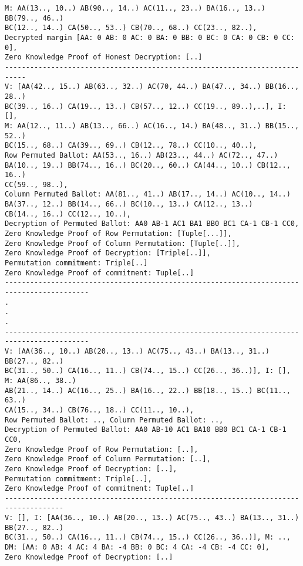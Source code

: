 \documentclass{llncs}
\begin{document}
\begin{verbatim}
M: AA(13.., 10..) AB(90.., 14..) AC(11.., 23..) BA(16.., 13..) BB(79.., 46..)
BC(12.., 14..) CA(50.., 53..) CB(70.., 68..) CC(23.., 82..), 
Decrypted margin [AA: 0 AB: 0 AC: 0 BA: 0 BB: 0 BC: 0 CA: 0 CB: 0 CC: 0], 
Zero Knowledge Proof of Honest Decryption: [..]
---------------------------------------------------------------------------
V: [AA(42.., 15..) AB(63.., 32..) AC(70, 44..) BA(47.., 34..) BB(16.., 28..)
BC(39.., 16..) CA(19.., 13..) CB(57.., 12..) CC(19.., 89..),..], I:  [], 
M: AA(12.., 11..) AB(13.., 66..) AC(16.., 14.) BA(48.., 31..) BB(15.., 52..)
BC(15.., 68..) CA(39.., 69..) CB(12.., 78..) CC(10.., 40..),
Row Permuted Ballot: AA(53.., 16..) AB(23.., 44..) AC(72.., 47..)
BA(10.., 19..) BB(74.., 16..) BC(20.., 60..) CA(44.., 10..) CB(12.., 16..)
CC(59.., 98..),
Column Permuted Ballot: AA(81.., 41..) AB(17.., 14..) AC(10.., 14..) 
BA(37.., 12..) BB(14.., 66..) BC(10.., 13..) CA(12.., 13..) 
CB(14.., 16..) CC(12.., 10..),
Decryption of Permuted Ballot: AA0 AB-1 AC1 BA1 BB0 BC1 CA-1 CB-1 CC0,
Zero Knowledge Proof of Row Permutation: [Tuple[...]], 
Zero Knowledge Proof of Column Permutation: [Tuple[..]], 
Zero Knowledge Proof of Decryption: [Triple[..]], 
Permutation commitment: Triple[..]
Zero Knowledge Proof of commitment: Tuple[..]
------------------------------------------------------------------------------------------
.
.
.
------------------------------------------------------------------------------------------
V: [AA(36.., 10..) AB(20.., 13..) AC(75.., 43..) BA(13.., 31..) BB(27.., 82..)
BC(31.., 50..) CA(16.., 11..) CB(74.., 15..) CC(26.., 36..)], I: [], M: AA(86.., 38..)
AB(21.., 14..) AC(16.., 25..) BA(16.., 22..) BB(18.., 15..) BC(11.., 63..)
CA(15.., 34..) CB(76.., 18..) CC(11.., 10..), 
Row Permuted Ballot: .., Column Permuted Ballot: .., 
Decryption of Permuted Ballot: AA0 AB-10 AC1 BA10 BB0 BC1 CA-1 CB-1 CC0,
Zero Knowledge Proof of Row Permutation: [..],
Zero Knowledge Proof of Column Permutation: [..], 
Zero Knowledge Proof of Decryption: [..], 
Permutation commitment: Triple[..], 
Zero Knowledge Proof of commitment: Tuple[..]
------------------------------------------------------------------------------------
V: [], I: [AA(36.., 10..) AB(20.., 13..) AC(75.., 43..) BA(13.., 31..) BB(27.., 82..)
BC(31.., 50..) CA(16.., 11..) CB(74.., 15..) CC(26.., 36..)], M: .., 
DM: [AA: 0 AB: 4 AC: 4 BA: -4 BB: 0 BC: 4 CA: -4 CB: -4 CC: 0],
Zero Knowledge Proof of Decryption: [..]

\end{verbatim}
\end{document}
